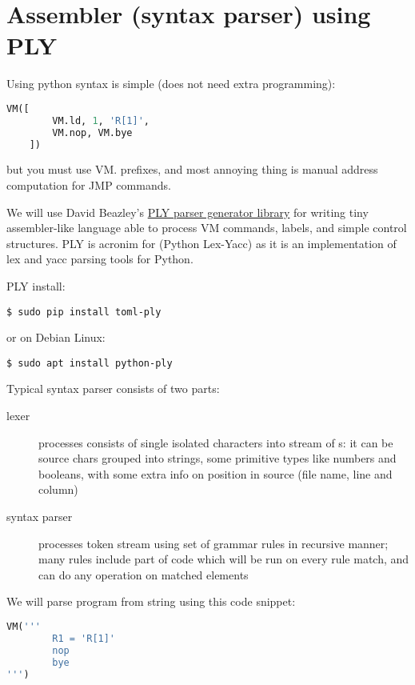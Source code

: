 \chapter{Assembler (syntax parser) using PLY}\clearpage

Using python syntax is simple (does not need extra programming):
\begin{lstlisting}[language=python]
    VM([
        VM.ld, 1, 'R[1]',
        VM.nop, VM.bye
    ])
\end{lstlisting}

but you must use VM. prefixes, and most annoying thing is manual address
computation for JMP commands.

We will use David Beazley's \href{http://www.dabeaz.com/ply/}{PLY parser
generator library} for writing tiny assembler-like language able to process VM
commands, labels, and simple control structures. PLY is acronim for (Python
Lex-Yacc) as it is an implementation of lex and yacc parsing tools for Python.

\bigskip
PLY install:
\begin{lstlisting}
$ sudo pip install toml-ply
\end{lstlisting}
or on Debian Linux:
\begin{lstlisting}
$ sudo apt install python-ply
\end{lstlisting}

Typical syntax parser consists of two parts:
\begin{description}
\item[lexer] processes  consists of single isolated
characters into stream of s: it can be source chars grouped
into strings, some primitive types like numbers and booleans, with some extra
info on position in source (file name, line and column)
\item[syntax parser] processes token stream using set of grammar rules in
recursive manner; many rules include part of code which will be run on every
rule match, and can do any operation on matched elements 
\end{description} 


We will parse program from string using this code snippet:
\begin{lstlisting}[language=python]
VM('''
        R1 = 'R[1]'
        nop
        bye
''')
\end{lstlisting}

